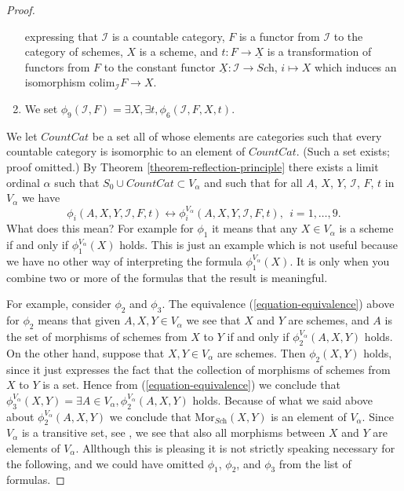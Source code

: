 \begin{proof}
\begin{enumerate}
expressing that $\mathcal{I}$ is a countable category, $F$ is 
a functor from $\mathcal{I}$ to the category of schemes,
$X$ is a scheme, and $t : F \to \underline{X}$
is a transformation of functors from $F$ to the constant
functor $\underline{X} : \mathcal{I} \to \textit{Sch}$,
$i \mapsto X$ which induces an isomorphism
$\text{colim}_{\mathcal{I}} F \to X$.
\item We set
$\phi_9(\mathcal{I}, F) = \exists X, \exists t, \phi_6(\mathcal{I}, F, X, t)$.
\end{enumerate}
We let $CountCat$ be a set all of whose elements are categories
such that every countable category is isomorphic to an element
of $CountCat$. (Such a set exists; proof omitted.)
By Theorem \ref{theorem-reflection-principle} there exists a
limit ordinal $\alpha$
such that $S_0 \cup CountCat \subset V_\alpha$ and such that
for all $A$, $X$, $Y$, $\mathcal{I}$, $F$, $t$ in $V_\alpha$ we
have
\begin{equation}
\label{equation-equivalence}
\phi_i(A, X, Y, \mathcal{I}, F, t)
\leftrightarrow
\phi_i^{V_\alpha}(A, X, Y, \mathcal{I}, F, t),\ \  i = 1, \ldots, 9.
\end{equation}
What does this mean? For example for $\phi_1$ it means that
any $X \in V_\alpha$ is a scheme if and only if $\phi_1^{V_\alpha}(X)$
holds. This is just an example which is not useful because we have
no other way of interpreting the formula $\phi_1^{V_\alpha}(X)$.
It is only when you combine two or more of the formulas
that the result is meaningful.

\medskip\noindent
For example, consider $\phi_2$ and $\phi_3$.
The equivalence (\ref{equation-equivalence}) above
for $\phi_2$ means that given $A, X, Y \in V_\alpha$ we see that
$X$ and $Y$ are schemes, and
$A$ is the set of morphisms of schemes from $X$ to $Y$ if and only
if $\phi_2^{V_\alpha}(A, X, Y)$ holds. On the other hand,
suppose that $X, Y \in V_\alpha$ are schemes. Then
$\phi_2(X, Y)$ holds, since it just expresses the fact that
the collection of morphisms of schemes from $X$ to $Y$ is a set.
Hence from (\ref{equation-equivalence}) we conclude that
$\phi_3^{V_\alpha}(X, Y) =
\exists A \in V_\alpha, \phi_2^{V_\alpha}(A, X, Y)$ holds.
Because of what we said above about $\phi_2^{V_\alpha}(A, X, Y)$
we conclude that $\text{Mor}_{\textit{Sch}}(X, Y)$ is an
element of $V_\alpha$. Since $V_\alpha$ is a transitive set,
see \cite[III Lemma 2.3]{Kunen}, we see that also 
all morphisms between $X$ and $Y$ are elements of $V_\alpha$.
Allthough this is pleasing it is not strictly speaking necessary for the
following, and we could have omitted $\phi_1$, $\phi_2$, and
$\phi_3$ from the list of formulas.


\end{proof}
